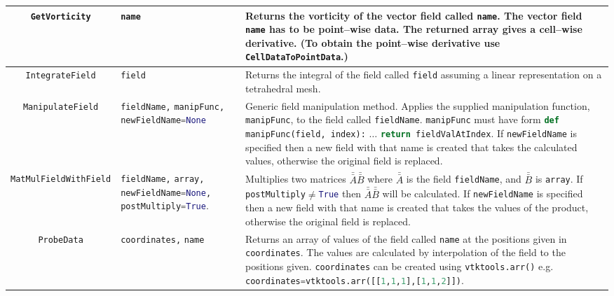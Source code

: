 \begin{landscape}
\begin{longtable}{|c | p{} |p{}|}
%
\lstinline[language=Python]+GetVorticity+ & \lstinline[language=Python]+name+ & Returns the vorticity of the vector field called \lstinline[language=Python]+name+. The vector field \lstinline[language=Python]+name+ has to be point--wise data. The returned array gives a cell--wise derivative. (To obtain the point--wise derivative use \lstinline[language=Python]+CellDataToPointData+.) \\ \hline
%
\lstinline[language=Python]+IntegrateField+ & \lstinline[language=Python]+field+ & Returns the integral of the field called \lstinline[language=Python]+field+ assuming a linear representation on a tetrahedral mesh. \\ \hline
%
\lstinline[language=Python]+ManipulateField+ & \lstinline[language=Python]+fieldName,+ \lstinline[language=Python]+manipFunc,+ \lstinline[language=Python]+newFieldName=None+ & Generic field manipulation method. Applies the supplied manipulation function, \lstinline[language=Python]+manipFunc+, to the field called \lstinline[language=Python]+fieldName+. \lstinline[language=Python]+manipFunc+ must have form \lstinline[language=Python]+def manipFunc(field, index):+ $\ldots$ \lstinline[language=Python]+return fieldValAtIndex+. If \lstinline[language=Python]+newFieldName+ is specified then a new field with that name is created that takes the calculated values, otherwise the original field is replaced. \\ \hline
%
\lstinline[language=Python]+MatMulFieldWithField+ & \lstinline[language=Python]+fieldName,+ \lstinline[language=Python]+array,+ \lstinline[language=Python]+newFieldName=None,+ \lstinline[language=Python]+postMultiply=True+. & Multiplies two matrices $\bar{\bar{A}}\bar{\bar{B}}$ where $\bar{\bar{A}}$ is the field \lstinline[language=Python]+fieldName+, and $\bar{\bar{B}}$ is \lstinline[language=Python]+array+. If \lstinline[language=Python]+postMultiply+$\neq$\lstinline[language=Python]+True+ then $\bar{\bar{A}}\bar{\bar{B}}$ will be calculated. If \lstinline[language=Python]+newFieldName+ is specified  then a new field with that name is created that takes the values of the product, otherwise the original field is replaced. \\ \hline
%
 \lstinline[language=Python]+ProbeData+ & \lstinline[language=Python]+coordinates,+ \lstinline[language=Python]+name+ & Returns an array of values of the field called \lstinline[language=Python]+name+ at the positions given in \lstinline[language=Python]+coordinates+. The values are calculated by interpolation of the field to the positions given. \lstinline[language=Python]+coordinates+ can be created using \lstinline[language=Python]+vtktools.arr()+ e.g. \lstinline[language=Python]+coordinates=vtktools.arr([[1,1,1],[1,1,2]])+. \\ \hline

\end{longtable}
\end{landscape}
